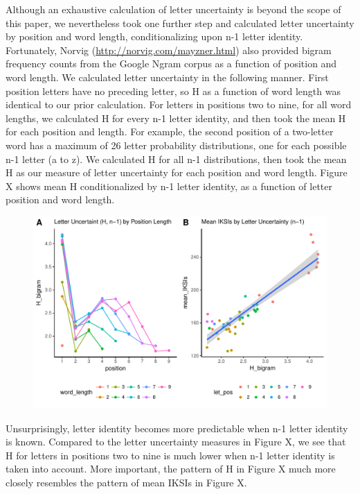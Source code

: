 \documentclass[floatsintext,man]{apa6}
\theoremstyle{definition}
\theoremstyle{definition}
\theoremstyle{definition}
\theoremstyle{remark}
\begin{document}
Although an exhaustive calculation of letter uncertainty is beyond the
scope of this paper, we nevertheless took one further step and
calculated letter uncertainty by position and word length,
conditionalizing upon n-1 letter identity. Fortunately, Norvig
(\url{http://norvig.com/mayzner.html}) also provided bigram frequency
counts from the Google Ngram corpus as a function of position and word
length. We calculated letter uncertainty in the following manner. First
position letters have no preceding letter, so H as a function of word
length was identical to our prior calculation. For letters in positions
two to nine, for all word lengths, we calculated H for every n-1 letter
identity, and then took the mean H for each position and length. For
example, the second position of a two-letter word has a maximum of 26
letter probability distributions, one for each possible n-1 letter (a to
z). We calculated H for all n-1 distributions, then took the mean H as
our measure of letter uncertainty for each position and word length.
Figure X shows mean H conditionalized by n-1 letter identity, as a
function of letter position and word length.

\begin{figure}
\centering
\includegraphics{Entropy_typing_draft_files/figure-latex/letter_uncertainty_bigram-1.pdf}
\caption{}
\end{figure}

Unsurprisingly, letter identity becomes more predictable when n-1 letter
identity is known. Compared to the letter uncertainty measures in Figure
X, we see that H for letters in positions two to nine is much lower when
n-1 letter identity is taken into account. More important, the pattern
of H in Figure X much more closely resembles the pattern of mean IKSIs
in Figure X.
\end{document}
